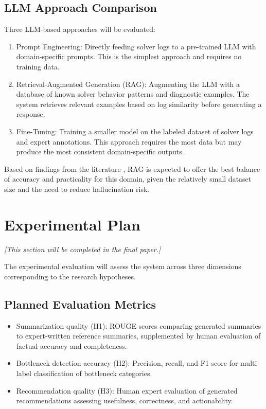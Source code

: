 \documentclass[11pt]{article}
\begin{document}
\subsection{LLM Approach Comparison}

Three LLM-based approaches will be evaluated:
\begin{enumerate}
    \item Prompt Engineering: Directly feeding solver logs to a pre-trained LLM with domain-specific prompts. This is the simplest approach and requires no training data.
    \item Retrieval-Augmented Generation (RAG): Augmenting the LLM with a database of known solver behavior patterns and diagnostic examples. The system retrieves relevant examples based on log similarity before generating a response.
    \item Fine-Tuning: Training a smaller model on the labeled dataset of solver logs and expert annotations. This approach requires the most data but may produce the most consistent domain-specific outputs.
\end{enumerate}

Based on findings from the literature \cite{akhtar2025llmbasedeventloganalysis}, RAG is expected to offer the best balance of accuracy and practicality for this domain, given the relatively small dataset size and the need to reduce hallucination risk.

\section{Experimental Plan}
\label{sec:experiments}

\textit{[This section will be completed in the final paper.]}

The experimental evaluation will assess the system across three dimensions corresponding to the research hypotheses.

\subsection{Planned Evaluation Metrics}

\begin{itemize}
    \item Summarization quality (H1): ROUGE scores comparing generated summaries to expert-written reference summaries, supplemented by human evaluation of factual accuracy and completeness.
    \item Bottleneck detection accuracy (H2): Precision, recall, and F1 score for multi-label classification of bottleneck categories.
    \item Recommendation quality (H3): Human expert evaluation of generated recommendations assessing usefulness, correctness, and actionability.
\end{itemize}
\end{document}
